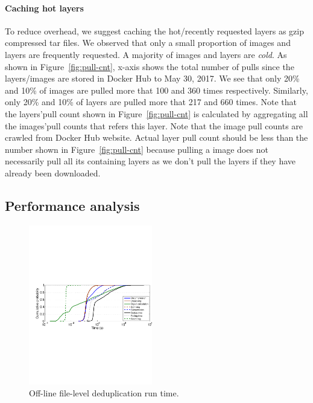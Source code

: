 \paragraph{Caching hot layers}
To reduce overhead, we suggest caching the hot/recently requested layers as
gzip compressed tar files. We observed that only a small proportion of images
and layers are frequently requested. A majority of images and layers are
\textit{cold}. As shown in Figure~\ref{fig:pull-cnt}, x-axis shows the total
number of pulls since the layers/images are stored in Docker Hub to May 30,
2017. We see that only 20\% and 10\% of images are pulled more that 100 and
360 times respectively. Similarly, only 20\% and 10\% of layers are pulled more
that 217 and 660 times. Note that the layers'pull count shown in
Figure~\ref{fig:pull-cnt} is calculated by aggregating all the images'pull
counts that refers this layer. Note that the image pull counts are crawled from
Docker Hub website. Actual layer pull count should be less than the number
shown in Figure~\ref{fig:pull-cnt} because pulling a image does not necessarily
pull all its containing layers as we don't pull the layers if they have already
been downloaded.


\subsection{Performance analysis}
%
\begin{figure}
	\centering
	\includegraphics[width=0.48\textwidth]{graphs/res-time.pdf}
	\caption{Off-line file-level deduplication run time.
	}
	\label{fig:dedup-res}
\end{figure}

%
%
%

